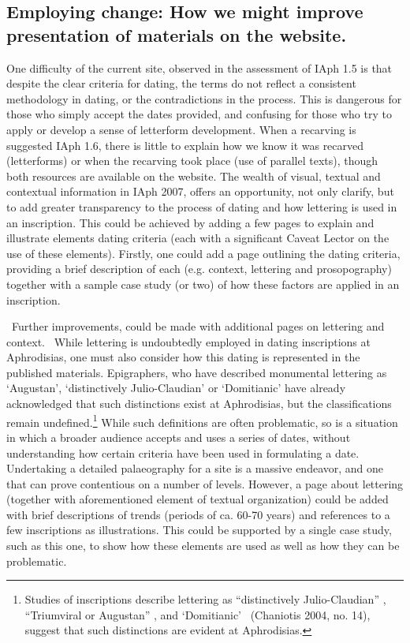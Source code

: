 \documentclass[amsthm,ebook]{saparticle}
\begin{document}
\subsection{Employing change: How we might improve presentation of materials on the website.}
\noindent One difficulty of the current site, observed in the assessment of IAph 1.5 is that despite the clear criteria for
dating, the terms do not reflect a consistent methodology in dating, or the contradictions in the process. This is
dangerous for those who simply accept the dates provided, and confusing for those who try to apply or develop a sense
of letterform development. When a recarving is suggested IAph 1.6, there is little to explain how we know it was
recarved (letterforms) or when the recarving took place (use of parallel texts), though both resources are available on
the website. The wealth of visual, textual and contextual information in IAph 2007, offers an opportunity, not only
clarify, but to add greater transparency to the process of dating and how lettering is used in an inscription. This
could be achieved by adding a few pages to explain and illustrate elements dating criteria (each with a significant
Caveat Lector on the use of these elements). Firstly, one could add a page outlining the dating criteria, providing a
brief description of each (e.g. context, lettering and prosopography) together with a sample case study (or two) of how
these factors are applied in an inscription. 




\ Further improvements, could be made with additional pages on lettering and context. \ While lettering is undoubtedly
employed in dating inscriptions at Aphrodisias, one must also consider how this dating is represented in the published
materials. Epigraphers, who have described monumental lettering as `Augustan', `distinctively Julio-Claudian' or
`Domitianic' have already acknowledged that such distinctions exist at Aphrodisias, but the classifications remain
undefined.\footnote{ Studies of inscriptions describe lettering as ``distinctively Julio-Claudian'' \citep[nos. 2\&3) 317-318]{reynolds1982}, ``Triumviral or Augustan'' \citep[docs. 35-37, 159-163]{reynolds1982}, and ‘Domitianic’ \ (Chaniotis 2004, no.
14), suggest that such distinctions are evident at Aphrodisias.} While such definitions are often problematic, so is
a situation in which a broader audience accepts and uses a series of dates, without understanding how certain criteria
have been used in formulating a date. Undertaking a detailed palaeography for a site is a massive endeavor, and one
that can prove contentious on a number of levels. However, a page about lettering (together with aforementioned element
of textual organization) could be added with brief descriptions of trends (periods of ca. 60-70 years) and references
to a few inscriptions as illustrations. This could be supported by a single case study, such as this one, to show how
these elements are used as well as how they can be problematic.
\end{document}
